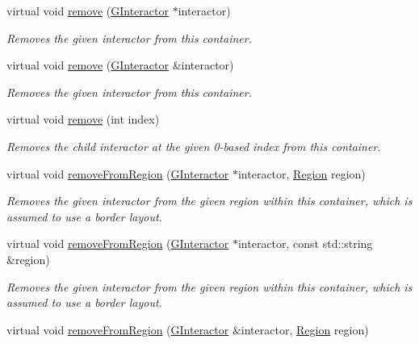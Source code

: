 \begin{DoxyCompactItemize}
virtual void \mbox{\hyperlink{classGContainer_a1c12b1fde5c2ef10d79d4ee51e670efa}{remove}} (\mbox{\hyperlink{classGInteractor}{G\+Interactor}} $\ast$interactor)
\begin{DoxyCompactList}\small\item\em Removes the given interactor from this container. \end{DoxyCompactList}\item 
virtual void \mbox{\hyperlink{classGContainer_ade2376c458ac401a0bd2dbe44271509e}{remove}} (\mbox{\hyperlink{classGInteractor}{G\+Interactor}} \&interactor)
\begin{DoxyCompactList}\small\item\em Removes the given interactor from this container. \end{DoxyCompactList}\item 
virtual void \mbox{\hyperlink{classGContainer_a2ad1aa316f278b2e9fa8121504749652}{remove}} (int index)
\begin{DoxyCompactList}\small\item\em Removes the child interactor at the given 0-\/based index from this container. \end{DoxyCompactList}\item 
virtual void \mbox{\hyperlink{classGContainer_a87a74b040025878283ba685e30d5104f}{remove\+From\+Region}} (\mbox{\hyperlink{classGInteractor}{G\+Interactor}} $\ast$interactor, \mbox{\hyperlink{classGContainer_a81a01a86de31071a92e6cce0bab9bc4b}{Region}} region)
\begin{DoxyCompactList}\small\item\em Removes the given interactor from the given region within this container, which is assumed to use a border layout. \end{DoxyCompactList}\item 
virtual void \mbox{\hyperlink{classGContainer_a16268c8344a5a5d9b10bde95764112d1}{remove\+From\+Region}} (\mbox{\hyperlink{classGInteractor}{G\+Interactor}} $\ast$interactor, const std\+::string \&region)
\begin{DoxyCompactList}\small\item\em Removes the given interactor from the given region within this container, which is assumed to use a border layout. \end{DoxyCompactList}\item 
virtual void \mbox{\hyperlink{classGContainer_afee7b65f917c4f6a0fdb1c8ea75406a5}{remove\+From\+Region}} (\mbox{\hyperlink{classGInteractor}{G\+Interactor}} \&interactor, \mbox{\hyperlink{classGContainer_a81a01a86de31071a92e6cce0bab9bc4b}{Region}} region)

\end{DoxyCompactItemize}
